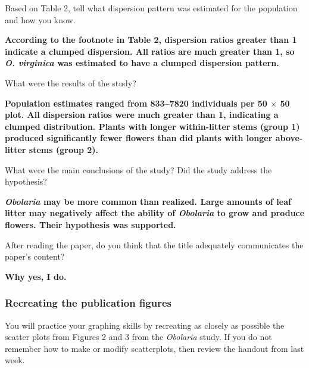 \documentclass[12pt, hidelinks]{exam}
\newcommand*\AnswerBox[2]{%
    \parbox[t][#1]{0.92\textwidth}{%
    \vspace{-0.5\baselineskip}\begin{solution}\textbf{#2}\end{solution}}
    \vspace{\stretch{1}}
}
\newlength{\basespace}
\begin{document}
\begin{questions}
\question
Based on Table 2, tell what dispersion pattern was estimated for the population and how you know.

\AnswerBox{3\baselineskip}{According to the footnote in Table 2, dispersion ratios greater than 1 indicate a clumped dispersion. All ratios are much greater than 1, so \textit{O. virginica} was estimated to have a clumped dispersion pattern.}

%

\question
What were the results of the study?

\AnswerBox{1.75\basespace}{Population estimates ranged from 833--7820 individuals per 50 $\times$ 50 plot. All dispersion ratios were much greater than 1, indicating a clumped distribution. Plants with longer within-litter stems (group 1) produced significantly fewer flowers than did plants with longer above-litter stems (group 2).}

\question
What were the main conclusions of the study? Did the study address the hypothesis?

\AnswerBox{0.75\basespace}{\textit{Obolaria} may be more common than realized. Large amounts of leaf litter may negatively affect the ability of \textit{Obolaria} to grow and produce flowers. Their hypothesis was supported.}

\question
After reading the paper, do you think that the title adequately
communicates the paper's content?

\AnswerBox{\baselineskip}{Why yes, I do.}


\newpage

\subsubsection*{Recreating the publication figures}

You will practice your graphing skills by recreating as closely as possible the scatter plots from Figures 2 and 3 from the \textit{Obolaria} study. If you do not remember how to make or modify scatterplots, then review the handout from last week. \medskip



\end{questions}
\end{document}

